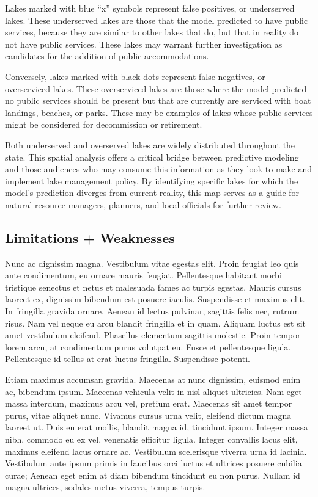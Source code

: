 \documentclass[
]{article}
\begin{document}
Lakes marked with blue ``x'' symbols represent false positives, or
underserved lakes. These underserved lakes are those that the model
predicted to have public services, because they are similar to other
lakes that do, but that in reality do not have public services. These
lakes may warrant further investigation as candidates for the addition
of public accommodations.

Conversely, lakes marked with black dots represent false negatives, or
overserviced lakes. These overserviced lakes are those where the model
predicted no public services should be present but that are currently
are serviced with boat landings, beaches, or parks. These may be
examples of lakes whose public services might be considered for
decommission or retirement.

Both underserved and overserved lakes are widely distributed throughout
the state. This spatial analysis offers a critical bridge between
predictive modeling and those audiences who may consume this information
as they look to make and implement lake management policy. By
identifying specific lakes for which the model's prediction diverges
from current reality, this map serves as a guide for natural resource
managers, planners, and local officials for further review.

\subsection{Limitations + Weaknesses}\label{limitations-weaknesses}

Nunc ac dignissim magna. Vestibulum vitae egestas elit. Proin feugiat
leo quis ante condimentum, eu ornare mauris feugiat. Pellentesque
habitant morbi tristique senectus et netus et malesuada fames ac turpis
egestas. Mauris cursus laoreet ex, dignissim bibendum est posuere
iaculis. Suspendisse et maximus elit. In fringilla gravida ornare.
Aenean id lectus pulvinar, sagittis felis nec, rutrum risus. Nam vel
neque eu arcu blandit fringilla et in quam. Aliquam luctus est sit amet
vestibulum eleifend. Phasellus elementum sagittis molestie. Proin tempor
lorem arcu, at condimentum purus volutpat eu. Fusce et pellentesque
ligula. Pellentesque id tellus at erat luctus fringilla. Suspendisse
potenti.

Etiam maximus accumsan gravida. Maecenas at nunc dignissim, euismod enim
ac, bibendum ipsum. Maecenas vehicula velit in nisl aliquet ultricies.
Nam eget massa interdum, maximus arcu vel, pretium erat. Maecenas sit
amet tempor purus, vitae aliquet nunc. Vivamus cursus urna velit,
eleifend dictum magna laoreet ut. Duis eu erat mollis, blandit magna id,
tincidunt ipsum. Integer massa nibh, commodo eu ex vel, venenatis
efficitur ligula. Integer convallis lacus elit, maximus eleifend lacus
ornare ac. Vestibulum scelerisque viverra urna id lacinia. Vestibulum
ante ipsum primis in faucibus orci luctus et ultrices posuere cubilia
curae; Aenean eget enim at diam bibendum tincidunt eu non purus. Nullam
id magna ultrices, sodales metus viverra, tempus turpis.
\end{document}
